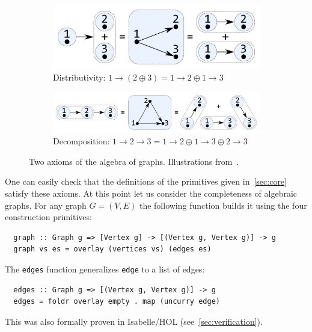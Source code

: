 \documentclass{article}
\newcommand{\hs}{\texttt}
\newcommand{\overlay}{\oplus}
\newcommand{\connect}{\rightarrow}
\begin{document}
\begin{figure}
  \begin{subfigure}[b]{0.4\linewidth}
    \centerline{\includegraphics[scale=0.24]{fig/ax-distributivity.pdf}}
    \caption{Distributivity: $1 \connect (2 \overlay 3) = 1 \connect 2 \overlay
      1 \connect 3$ }
  \end{subfigure}
  \hspace{12mm}
  \begin{subfigure}[b]{0.5\linewidth}
    \centerline{\includegraphics[scale=0.24]{fig/ax-decomposition.pdf}}
    \caption{Decomposition: $1 \connect 2 \connect 3 = {1 \connect 2} \overlay
      1 \connect 3 \overlay 2 \connect 3$}
  \end{subfigure}
  \vspace{-1mm}
  \caption{Two axioms of the algebra of graphs. Illustrations from~\cite{mokhov2017algebraic}.\label{fig:axioms}}
\end{figure}
One can easily check that the definitions of the primitives given
in~\autoref{sec:core} satisfy these axioms. At this point let us consider the
completeness of algebraic graphs. For any graph $G=(V,E)$ the following function
builds it using the four construction primitives:
\begin{verbatim}
  graph :: Graph g => [Vertex g] -> [(Vertex g, Vertex g)] -> g
  graph vs es = overlay (vertices vs) (edges es)
\end{verbatim}
The \hs{edges} function generalizes \hs{edge} to a list of edges:
\begin{verbatim}
  edges :: Graph g => [(Vertex g, Vertex g)] -> g
  edges = foldr overlay empty . map (uncurry edge)
\end{verbatim}
This was also formally proven in Isabelle/HOL (see~\autoref{sec:verification}).
\end{document}
